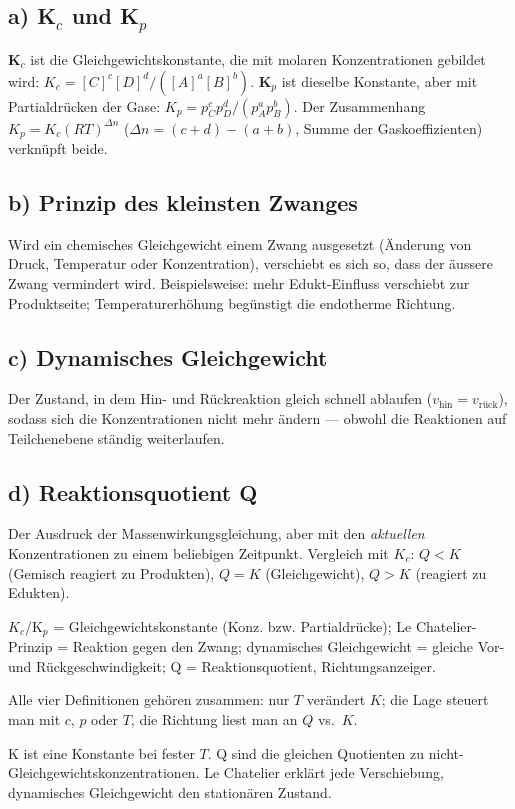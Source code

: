 
\subsection*{a) K$_c$ und K$_p$}
\textbf{K$_c$} ist die Gleichgewichtskonstante, die mit molaren
Konzentrationen gebildet wird:
$K_c = [C]^c[D]^d/([A]^a[B]^b)$.
\textbf{K$_p$} ist dieselbe Konstante, aber mit Partialdrücken der Gase:
$K_p = p_C^c p_D^d / (p_A^a p_B^b)$. Der Zusammenhang $K_p = K_c(RT)^{\Delta n}$
($\Delta n = (c+d)-(a+b)$, Summe der Gaskoeffizienten) verknüpft beide.

\subsection*{b) Prinzip des kleinsten Zwanges}
Wird ein chemisches Gleichgewicht einem Zwang ausgesetzt (Änderung von
Druck, Temperatur oder Konzentration), verschiebt es sich so, dass der
äussere Zwang vermindert wird. Beispielsweise: mehr Edukt-Einfluss
verschiebt zur Produktseite; Temperaturerhöhung begünstigt die
endotherme Richtung.

\subsection*{c) Dynamisches Gleichgewicht}
Der Zustand, in dem Hin- und Rückreaktion gleich schnell ablaufen
($v_{\text{hin}}=v_{\text{rück}}$), sodass sich die Konzentrationen nicht
mehr ändern --- obwohl die Reaktionen auf Teilchenebene ständig weiterlaufen.

\subsection*{d) Reaktionsquotient Q}
Der Ausdruck der Massenwirkungsgleichung, aber mit den \emph{aktuellen}
Konzentrationen zu einem beliebigen Zeitpunkt.
Vergleich mit $K_c$: $Q<K$ (Gemisch reagiert zu Produkten), $Q=K$
(Gleichgewicht), $Q>K$ (reagiert zu Edukten).

\begin{ergebnis}
$K_c$/K$_p$ = Gleichgewichtskonstante (Konz. bzw. Partialdrücke);
Le Chatelier-Prinzip = Reaktion gegen den Zwang; dynamisches
Gleichgewicht = gleiche Vor- und Rückgeschwindigkeit; Q =
Reaktionsquotient, Richtungsanzeiger.
\end{ergebnis}

\begin{kontrolle}
Alle vier Definitionen gehören zusammen: nur $T$ verändert $K$; die
Lage steuert man mit $c$, $p$ oder $T$, die Richtung liest man an
$Q$ vs.\ $K$.
\end{kontrolle}

\begin{merksatz}
K ist eine Konstante bei fester $T$. Q sind die gleichen Quotienten zu
nicht-Gleichgewichtskonzentrationen. Le Chatelier erklärt jede
Verschiebung, dynamisches Gleichgewicht den stationären Zustand.
\end{merksatz}

